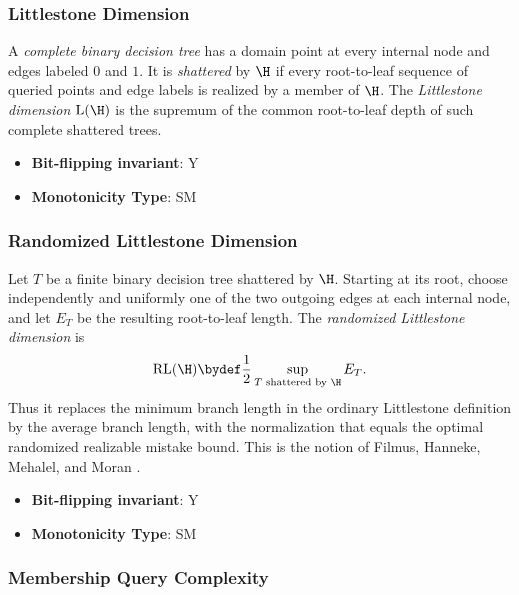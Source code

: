 \subsubsection{Littlestone Dimension}
      
      \begin{definition}\label{def:littlestone_dimension}
      A \emph{complete binary decision tree} has a domain point at every internal node and edges labeled $0$ and $1$.  It is \emph{shattered} by $\H$ if every root-to-leaf sequence of queried points and edge labels is realized by a member of $\H$.  The \emph{Littlestone dimension} $\mathrm L(\H)$ is the supremum of the common root-to-leaf depth of such complete shattered trees.
      \end{definition}
      \begin{itemize}
      \item {\bf Bit-flipping invariant}: Y
      \item {\bf Monotonicity Type}: SM
      \end{itemize}
\subsubsection{Randomized Littlestone Dimension}
      
      \begin{definition}\label{def:randomized_littlestone_dimension}
      Let $T$ be a finite binary decision tree shattered by $\H$.  Starting at its root, choose independently and uniformly one of the two outgoing edges at each internal node, and let $E_T$ be the resulting root-to-leaf length.  The \emph{randomized Littlestone dimension} is
      \[
        \mathrm{RL}(\H) \bydef \frac12\sup_{T\text{ shattered by }\H} E_T.
      \]
      Thus it replaces the minimum branch length in the ordinary Littlestone definition by the average branch length, with the normalization that equals the optimal randomized realizable mistake bound.  This is the notion of Filmus, Hanneke, Mehalel, and Moran \cite{filmus2023randomized}.
      \end{definition}
      \begin{itemize}
      \item {\bf Bit-flipping invariant}: Y
      \item {\bf Monotonicity Type}: SM
      \end{itemize}
\subsubsection{Membership Query Complexity}
      
